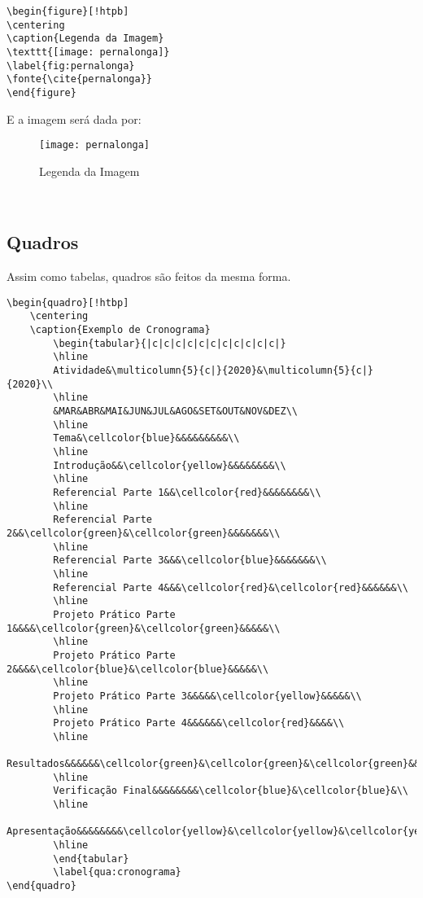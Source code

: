 \begin{verbatim}
\begin{figure}[!htpb]
\centering
\caption{Legenda da Imagem}
\texttt{[image: pernalonga]}
\label{fig:pernalonga}
\fonte{\cite{pernalonga}}
\end{figure}
\end{verbatim}
E a imagem será dada por:
\begin{figure}[!hb]
\centering
\caption{Legenda da Imagem}
\texttt{[image: pernalonga]}
\label{fig:pernalonga}
\end{figure}\\

\subsection{Quadros}
\label{quadros}
Assim como tabelas, quadros são feitos da mesma forma.\\
\begin{center}
\footnotesize
\begin{verbatim}
\begin{quadro}[!htbp]
	\centering
	\caption{Exemplo de Cronograma}
		\begin{tabular}{|c|c|c|c|c|c|c|c|c|c|c|}
		\hline
		Atividade&\multicolumn{5}{c|}{2020}&\multicolumn{5}{c|}{2020}\\
		\hline
		&MAR&ABR&MAI&JUN&JUL&AGO&SET&OUT&NOV&DEZ\\
		\hline
		Tema&\cellcolor{blue}&&&&&&&&&\\
		\hline
		Introdução&&\cellcolor{yellow}&&&&&&&&\\
		\hline	
		Referencial Parte 1&&\cellcolor{red}&&&&&&&&\\
		\hline			
		Referencial Parte 2&&\cellcolor{green}&\cellcolor{green}&&&&&&&\\
		\hline	
		Referencial Parte 3&&&\cellcolor{blue}&&&&&&&\\
		\hline
		Referencial Parte 4&&&\cellcolor{red}&\cellcolor{red}&&&&&&\\
		\hline	
		Projeto Prático Parte 1&&&&\cellcolor{green}&\cellcolor{green}&&&&&\\
		\hline	
		Projeto Prático Parte 2&&&&\cellcolor{blue}&\cellcolor{blue}&&&&&\\
		\hline	
		Projeto Prático Parte 3&&&&&\cellcolor{yellow}&&&&&\\
		\hline	
		Projeto Prático Parte 4&&&&&&\cellcolor{red}&&&&\\
		\hline	
		Resultados&&&&&&\cellcolor{green}&\cellcolor{green}&\cellcolor{green}&&\\
		\hline	
		Verificação Final&&&&&&&&\cellcolor{blue}&\cellcolor{blue}&\\
		\hline	
		Apresentação&&&&&&&&\cellcolor{yellow}&\cellcolor{yellow}&\cellcolor{yellow}\\
		\hline	
		\end{tabular}
		\label{qua:cronograma}
\end{quadro}
\end{verbatim}
\end{center}

